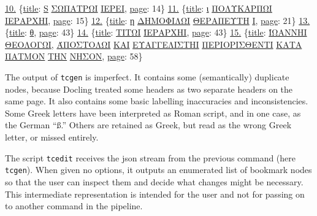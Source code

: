 \documentclass[
  letterpaper,
]{tufte-handout}
\newenvironment{Shaded}{\begin{snugshade}}{\end{snugshade}}
\newcommand{\DecValTok}[1]{\textcolor[rgb]{0.69,0.50,0.00}{#1}}
\newcommand{\ErrorTok}[1]{\textcolor[rgb]{0.75,0.01,0.01}{\underline{#1}}}
\newcommand{\FunctionTok}[1]{\textcolor[rgb]{0.39,0.29,0.61}{#1}}
\begin{document}
\begin{Shaded}
\begin{Highlighting}[]
\ErrorTok{10.} \FunctionTok{\{}\ErrorTok{\textquotesingle{}title\textquotesingle{}}\FunctionTok{:} \ErrorTok{\textquotesingle{}S} \ErrorTok{ΣΩΠΑΤΡΩΙ}  \ErrorTok{IEPEI\textquotesingle{}}\FunctionTok{,} \ErrorTok{\textquotesingle{}page\textquotesingle{}}\FunctionTok{:} \DecValTok{14}\FunctionTok{\}}
\ErrorTok{11.} \FunctionTok{\{}\ErrorTok{\textquotesingle{}title\textquotesingle{}}\FunctionTok{:} \ErrorTok{\textquotesingle{}ι} \ErrorTok{ΠΟΛΥΚΑΡΠΩΙ}  \ErrorTok{ΙΕΡΑΡΧΗΙ\textquotesingle{}}\FunctionTok{,} \ErrorTok{\textquotesingle{}page\textquotesingle{}}\FunctionTok{:} \DecValTok{15}\FunctionTok{\}}
\ErrorTok{12.} \FunctionTok{\{}\ErrorTok{\textquotesingle{}title\textquotesingle{}}\FunctionTok{:} \ErrorTok{\textquotesingle{}η} \ErrorTok{ΔΗΜΟΦΙΛΩΙ}  \ErrorTok{ΘΕΡΑΠΕΥΤΗ} \ErrorTok{I\textquotesingle{}}\FunctionTok{,} \ErrorTok{\textquotesingle{}page\textquotesingle{}}\FunctionTok{:} \DecValTok{21}\FunctionTok{\}}
\ErrorTok{13.} \FunctionTok{\{}\ErrorTok{\textquotesingle{}title\textquotesingle{}}\FunctionTok{:} \ErrorTok{\textquotesingle{}θ\textquotesingle{}}\FunctionTok{,} \ErrorTok{\textquotesingle{}page\textquotesingle{}}\FunctionTok{:} \DecValTok{43}\FunctionTok{\}}
\ErrorTok{14.} \FunctionTok{\{}\ErrorTok{\textquotesingle{}title\textquotesingle{}}\FunctionTok{:} \ErrorTok{\textquotesingle{}ΤΙΤΩΙ}  \ErrorTok{ΊΕΡΑΡΧΗΙ\textquotesingle{}}\FunctionTok{,} \ErrorTok{\textquotesingle{}page\textquotesingle{}}\FunctionTok{:} \DecValTok{43}\FunctionTok{\}}
\ErrorTok{15.} \FunctionTok{\{}\ErrorTok{\textquotesingle{}title\textquotesingle{}}\FunctionTok{:} \ErrorTok{\textquotesingle{}ΊΩΑΝΝΗΙ}  \ErrorTok{ΘΕΟΛΟΓΩΙ}\FunctionTok{,}  \ErrorTok{ΆΠΟΣΤΟΛΩΙ}  \ErrorTok{ΚΑΙ}  \ErrorTok{ΕΥΑΓΓΕΛΙΣΤΗΙ} \ErrorTok{ΠΕΡΙΟΡΙΣΘΕΝΤΙ}  \ErrorTok{ΚΑΤΑ} \ErrorTok{ΠΑΤΜΟΝ}  \ErrorTok{ΤΗΝ}  \ErrorTok{ΝΗΣΟΝ\textquotesingle{}}\FunctionTok{,} \ErrorTok{\textquotesingle{}page\textquotesingle{}}\FunctionTok{:} \DecValTok{58}\FunctionTok{\}}
\end{Highlighting}
\end{Shaded}

The output of \texttt{tcgen} is imperfect. It contains some
(semantically) duplicate nodes, because Docling treated some headers as
two separate headers on the same page. It also contains some basic
labelling inaccuracies and inconsistencies. Some Greek letters have been
interpreted as Roman script, and in one case, as the German ``ß.''
Others are retained as Greek, but read as the wrong Greek letter, or
missed entirely.

The script \texttt{tcedit} receives the json stream from the previous
command (here \texttt{tcgen}). When given no options, it outputs an
enumerated list of bookmark nodes so that the user can inspect them and
decide what changes might be necessary. This intermediate representation
is intended for the user and not for passing on to another command in
the pipeline.
\end{document}
